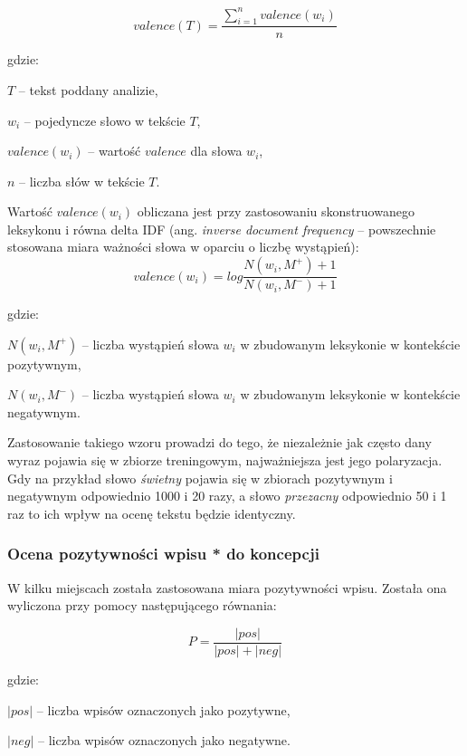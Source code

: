 \begin{equation}
valence(T) = \frac{\sum\limits_{i = 1}^n valence(w_i)}{n}
\label{equation:pakparoubek}
\end{equation}

gdzie:

$T$ -- tekst poddany analizie,

$w_i$ -- pojedyncze słowo w tekście $T$,

$valence(w_i)$ -- wartość $valence$ dla słowa $w_i$,

$n$ -- liczba słów w tekście $T$.

\bigskip


Wartość $valence(w_i)$ obliczana jest przy zastosowaniu skonstruowanego
leksykonu i równa delta IDF (ang. \textit{inverse document frequency} -- 
powszechnie stosowana miara ważności słowa w oparciu o liczbę wystąpień):
\begin{equation}
valence(w_i) = log\frac{N(w_i, M^+) + 1}{N(w_i, M^-) + 1}
\end{equation} 

gdzie:

$N(w_i, M^+)$ -- liczba wystąpień słowa $w_i$ w zbudowanym leksykonie w 
kontekście pozytywnym,

$N(w_i, M^-)$ -- liczba wystąpień słowa $w_i$ w zbudowanym leksykonie w 
kontekście negatywnym.

\bigskip
Zastosowanie takiego wzoru prowadzi do tego, że niezależnie jak często
dany wyraz pojawia się w zbiorze treningowym, najważniejsza jest jego polaryzacja.
Gdy na przykład słowo \textit{świetny} pojawia się w zbiorach pozytywnym
i negatywnym odpowiednio 1000 i 20 razy, a słowo \textit{przezacny} odpowiednio
50 i 1 raz to ich wpływ na ocenę tekstu będzie identyczny.


\subsubsection{Ocena pozytywności wpisu * do koncepcji}
W kilku miejscach została zastosowana miara pozytywności wpisu.
Została ona wyliczona przy pomocy następującego równania:

\begin{equation}
\label{equation:pozytywnosc}
P = \frac{|pos|}{|pos| + |neg|}
\end{equation}

gdzie:

$|pos|$ -- liczba wpisów oznaczonych jako pozytywne,

$|neg|$ -- liczba wpisów oznaczonych jako negatywne.



